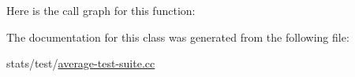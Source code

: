 Here is the call graph for this function\+:




The documentation for this class was generated from the following file\+:\begin{DoxyCompactItemize}
\item 
stats/test/\hyperlink{average-test-suite_8cc}{average-\/test-\/suite.\+cc}\end{DoxyCompactItemize}

